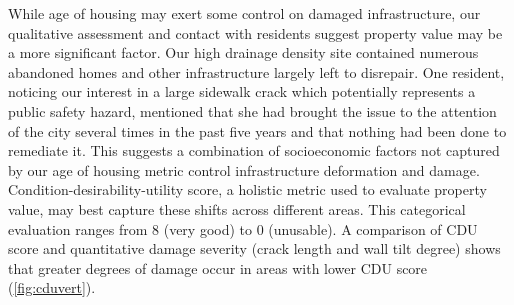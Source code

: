 \documentclass[final,12pt,times,twocolumn,authoryear]{elsarticle}
\begin{document}
While age of housing may exert some control on damaged infrastructure, our qualitative assessment and contact with residents suggest property value may be a more significant factor. Our high drainage density site contained numerous abandoned homes and other infrastructure largely left to disrepair. One resident, noticing our interest in a large sidewalk crack which potentially represents a public safety hazard, mentioned that she had brought the issue to the attention of the city several times in the past five years and that nothing had been done to remediate it. This suggests a combination of socioeconomic factors not captured by our age of housing metric control infrastructure deformation and damage. Condition-desirability-utility score, a holistic metric used to evaluate property value, may best capture these shifts across different areas. This categorical evaluation ranges from 8 (very good) to 0 (unusable). A comparison of CDU score and quantitative damage severity (crack length and wall tilt degree) shows that greater degrees of damage occur in areas with lower CDU score (\autoref{fig:cduvert}).
\end{document}
